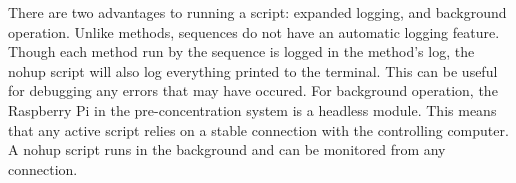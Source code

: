 There are two advantages to running a  script: expanded logging, and background operation. Unlike methods, sequences do not have an automatic logging feature. Though each method run by the sequence is logged in the method's log, the nohup script will also log everything printed to the terminal. This can be useful for debugging any errors that may have occured. For background operation, the Raspberry Pi in the pre-concentration system is a headless module. This means that any active script relies on a stable connection with the controlling computer. A nohup script runs in the background and can be monitored from any connection. 

\pagebreak